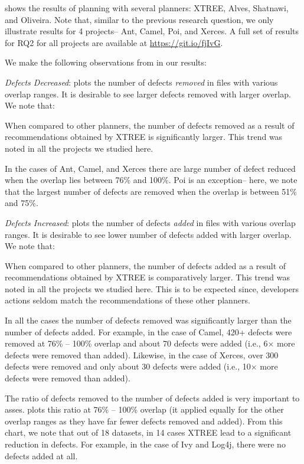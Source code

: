  shows the results of planning with several planners: XTREE, Alves, Shatnawi, and Oliveira. Note that, similar to the previous research question, we only illustrate results for 4 projects-- Ant, Camel, Poi, and Xerces. A full set of results for RQ2 for all projects are available at \url{https://git.io/fjIvG}. 

We make the following observations from in our results: 
\be
\item \textit{Defects Decreased}: \protect{} plots the number of defects \textit{removed} in files with various overlap ranges. It is desirable to see larger defects removed with larger overlap. We note that:
\bi
\item When compared to other planners, the number of defects removed as a result of recommendations obtained by XTREE is significantly larger. This trend was noted in all the projects we studied here.
\item In the cases of Ant, Camel, and Xerces there are large number of defect reduced when the overlap lies between 76\% and 100\%. Poi is an exception-- here, we note that the largest number of defects are removed when the overlap is between 51\% and 75\%. 
\ei

\item \textit{Defects Increased}: \protect{} plots the number of defects \textit{added} in files with various overlap ranges. It is desirable to see lower number of defects added with larger overlap. We note that: 
\bi
\item When compared to other planners, the number of defects added as a result of recommendations obtained by XTREE is comparatively larger. This trend was noted in all the projects we studied here. This is to be expected since, developers actions seldom match the recommendations of these other planners. 

\item In all the cases the number of defects removed was significantly larger than the number of defects added. For example, in the case of Camel, 420+ defects were removed at 76\% -- 100\% overlap and about 70 defects were added (i.e., 6$\times$ more defects were removed than added). Likewise, in the case of Xerces, over 300 defects were removed and only about 30 defects were added (i.e., 10$\times$ more defects were removed than added).
\ei
\ee

The ratio of defects removed to the number of defects added is very important to asses.  plots this ratio at 76\% -- 100\% overlap (it applied equally for the other overlap ranges as they have far fewer defects removed and added). From this chart, we note that out of 18 datasets, in 14 cases XTREE lead to a significant reduction in defects. For example, in the case of Ivy and Log4j, there were no defects added at all.

